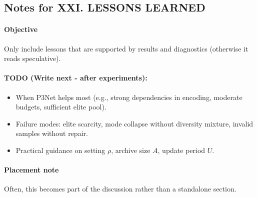 \subsection*{Notes for XXI. LESSONS LEARNED}
\paragraph{Objective}
Only include lessons that are supported by results and diagnostics (otherwise it reads speculative).

\paragraph{TODO (Write next - after experiments):}
\begin{itemize}
  \item When P3Net helps most (e.g., strong dependencies in encoding, moderate budgets, sufficient elite pool).
  \item Failure modes: elite scarcity, mode collapse without diversity mixture, invalid samples without repair.
  \item Practical guidance on setting $\rho$, archive size $A$, update period $U$.
\end{itemize}

\paragraph{Placement note}
Often, this becomes part of the discussion rather than a standalone section.
